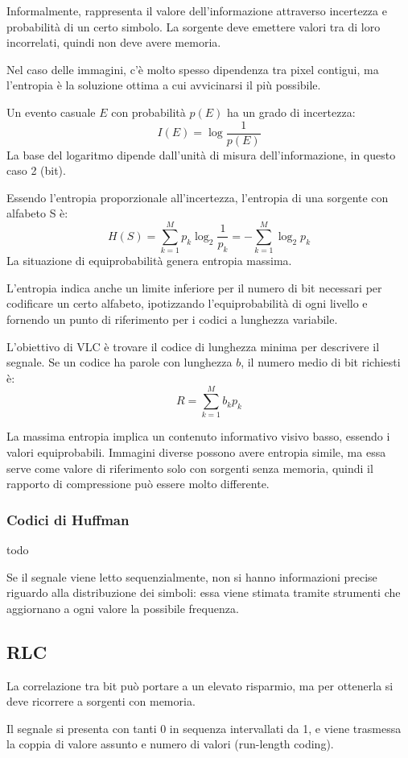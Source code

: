 Informalmente, rappresenta il valore dell'informazione attraverso incertezza e probabilità di un certo simbolo. La sorgente deve emettere valori tra di loro incorrelati, quindi non deve avere memoria. 

Nel caso delle immagini, c'è molto spesso dipendenza tra pixel contigui, ma l'entropia è la soluzione ottima a cui avvicinarsi il più possibile.

Un evento casuale $E$ con probabilità $p(E)$ ha un grado di incertezza:
$$I(E) = \log \frac{1}{p(E)}$$
La base del logaritmo dipende dall'unità di misura dell'informazione, in questo caso 2 (bit).

Essendo l'entropia proporzionale all'incertezza, l'entropia di una sorgente con alfabeto S è:
$$H(S) = \sum_{k=1}^{M} p_k \log_2 \frac{1}{p_k} = -\sum_{k=1}^{M}\log_2p_k$$
La situazione di equiprobabilità genera entropia massima.

L'entropia indica anche un limite inferiore per il numero di bit necessari per codificare un certo alfabeto, ipotizzando l'equiprobabilità di ogni livello e fornendo un punto di riferimento per i codici a lunghezza variabile. 

L'obiettivo di VLC è trovare il codice di lunghezza minima per descrivere il segnale. Se un codice ha parole con lunghezza $b$, il numero medio di bit richiesti è:
$$R = \sum_{k=1}^{M}b_kp_k$$

La massima entropia implica un contenuto informativo visivo basso, essendo i valori equiprobabili. Immagini diverse possono avere entropia simile, ma essa serve come valore di riferimento solo con sorgenti senza memoria, quindi il rapporto di compressione può essere molto differente.

\subsubsection{Codici di Huffman}
todo

Se il segnale viene letto sequenzialmente, non si hanno informazioni precise riguardo alla distribuzione dei simboli: essa viene stimata tramite strumenti che aggiornano a ogni valore la possibile frequenza.

\subsection{RLC}
La correlazione tra bit può portare a un elevato risparmio, ma per ottenerla si deve ricorrere a sorgenti con memoria. 

Il segnale si presenta con tanti 0 in sequenza intervallati da 1, e viene trasmessa la coppia di valore assunto e numero di valori (run-length coding). 

